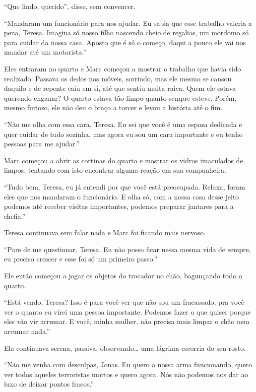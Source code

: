 ``Que lindo, querido'', disse, sem convencer.

``Mandaram um funcionário para nos ajudar. Eu sabia que esse trabalho
valeria a pena, Teresa. Imagina só nosso filho nascendo cheio de
regalias, um mordomo só para cuidar da nossa casa. Aposto que é só o
começo, daqui a pouco ele vai nos mandar até um motorista.''

Eles entraram no quarto e Marc começou a mostrar o trabalho que havia
sido realizado. Passava os dedos nos móveis, sorrindo, mas ele mesmo se
cansou daquilo e de repente caiu em si, até que sentiu muita raiva. Quem
ele estava querendo enganar? O quarto estava tão limpo quanto sempre
esteve. Porém, mesmo furioso, ele não deu o braço a torcer e levou a
história até o fim.

``Não me olha com essa cara, Teresa. Eu sei que você é uma esposa
dedicada e quer cuidar de tudo sozinha, mas agora eu sou um cara
importante e eu tenho pessoas para me ajudar.''

Marc começou a abrir as cortinas do quarto e mostrar os vidros
imaculados de limpos, tentando com isto encontrar alguma reação em sua
companheira.

``Tudo bem, Teresa, eu já entendi por que você está preocupada. Relaxa,
foram eles que nos mandaram o funcionário. E olha só, com a nossa casa
desse jeito podemos até receber visitas importantes, podemos preparar
jantares para a chefia.''

Teresa continuava sem falar nada e Marc foi ficando mais nervoso.

``Pare de me questionar, Teresa. Eu não posso ficar nessa mesma vida de
sempre, eu preciso crescer e esse foi só um primeiro passo.''

Ele então começou a jogar os objetos do trocador no chão, bagunçando
todo o quarto.

``Está vendo, Teresa? Isso é para você ver que não sou um fracassado,
pra você ver o quanto eu virei uma pessoa importante. Podemos fazer o
que quiser porque eles vão vir arrumar. E você, minha mulher, não
precisa mais limpar o chão nem arrumar nada.''

Ela continuava serena, passiva, observando\ldots{} uma lágrima
escorria do seu rosto.

\asterisc


``Não me venha com desculpas, Jonas. Eu quero a nossa arma funcionando,
quero ver todos aqueles terroristas mortos e quero agora. Nós não
podemos nos dar ao luxo de deixar pontos fracos.''

